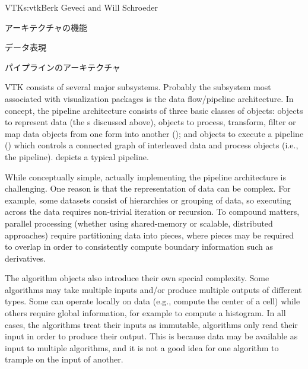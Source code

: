\begin{aosachapter}{VTK}{s:vtk}{Berk Geveci and Will Schroeder}
\begin{aosasect1}{アーキテクチャの機能}
\begin{aosasect2}{データ表現}

\end{aosasect2}

\begin{aosasect2}{パイプラインのアーキテクチャ}

VTK consists of several major subsystems. Probably the subsystem most
associated with visualization packages is the data flow/pipeline
architecture. In concept, the pipeline architecture consists of three
basic classes of objects: objects to represent data (the
s discussed above), objects to process, transform,
filter or map data objects from one form into another
(); and objects to execute a pipeline
() which controls a connected graph of interleaved
data and process objects (i.e., the
pipeline).  depicts a typical pipeline.


While conceptually simple, actually implementing the pipeline
architecture is challenging. One reason is that the representation of
data can be complex. For example, some datasets consist of hierarchies
or grouping of data, so executing across the data requires non-trivial
iteration or recursion. To compound matters, parallel
processing (whether using shared-memory or scalable, distributed
approaches) require partitioning data into pieces, where pieces may be
required to overlap in order to consistently compute boundary
information such as derivatives.

The algorithm objects also introduce their own special
complexity. Some algorithms may take multiple inputs and/or produce
multiple outputs of different types. Some can operate locally on data
(e.g., compute the center of a cell) while others require global
information, for example to compute a histogram. In all cases, the
algorithms treat their inputs as immutable, algorithms only read their
input in order to produce their output. This is because data may be
available as input to multiple algorithms, and it is not a good idea
for one algorithm to trample on the input of another.


\end{aosasect2}
\end{aosasect1}
\end{aosachapter}
